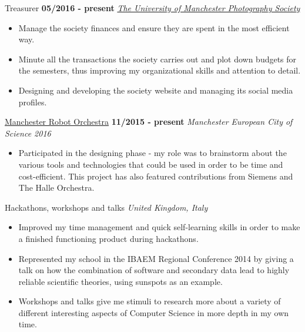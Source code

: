 \documentclass[]{friggeri-cv}
\begin{document}
\begin{entrylist}
\begin{itemize}
    \end{itemize}
  \entry
    {}
    {Treasurer}
    {\textbf{05/2016 - present}}
    {\emph{\href{https://www.facebook.com/UoMPhotoSoc/}{The University of Manchester Photography Society}}}
    \begin{itemize}
        \item Manage the society finances and ensure they are spent in the most efficient way.
        \item Minute all the transactions the society carries out and plot down budgets for the se\-mes\-ters, thus improving my organizational skills and attention to detail.
        \item Designing and developing the society website and managing its social media profiles. \\
    \end{itemize}
  \entry
    {}
    {\href{http://manchestersciencecity.com/inspire/article/the-robots-are-coming/}{Manchester Robot Orchestra}}
    {\textbf{11/2015 - present}}
    {\emph{Manchester European City of Science 2016}}
    \begin{itemize}
        \item Participated in the designing phase - my role was to brainstorm about the various tools and technologies that could be used in order to be time and cost-efficient. This project has also featured contributions from Siemens and The Halle Orchestra.
    \end{itemize}
  \entry
    {\null}
    {Hackathons, workshops and talks}
    {}
    {\emph{United Kingdom, Italy}}
    \begin{itemize}
        \item Improved my time management and quick self-learning skills in order to make a finished functioning product during hackathons.
        \item Represented my school in the IBAEM Regional Conference 2014 by giving a talk on how the combination of software and secondary data lead to highly reliable scientific theories, using sunspots as an example.
        \item Workshops and talks give me stimuli to research more about a variety of different interesting aspects of Computer Science in more depth in my own time.
    \end{itemize}
\end{entrylist}
\end{document}
